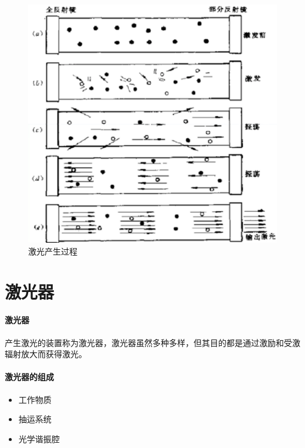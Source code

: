 \begin{figure}[!htbp]
	\centering
	\includegraphics[width=0.6\linewidth]{figure/Chapter2/激光的产生过程}
	\caption{激光产生过程}
	\label{fig:Chpater2-激光产生过程}
\end{figure}

\section{激光器} %

\paragraph{激光器}产生激光的装置称为激光器，激光器虽然多种多样，但其目的都是通过激励和受激辐射放大而获得激光。
\paragraph{激光器的组成}\begin{itemize}
	\item 工作物质
	\item 抽运系统
	\item 光学谐振腔
\end{itemize}
